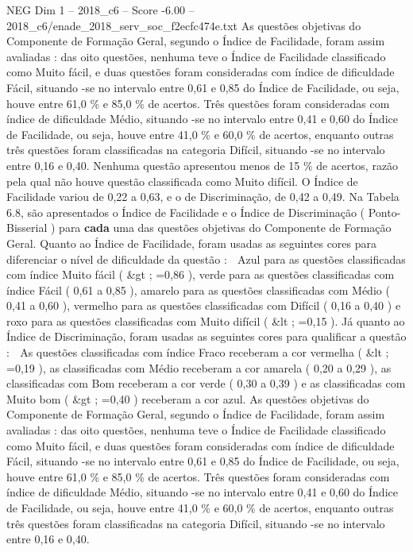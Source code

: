 \begin{textsample}{NEG Dim 1 – 2018\_c6 – Score -6.00 – 2018\_c6/enade\_2018\_serv\_soc\_f2ecfc474e.txt}
As questões objetivas do Componente de Formação Geral, segundo o Índice de Facilidade, foram assim avaliadas : das oito questões, nenhuma teve o Índice de Facilidade classificado como Muito fácil, e duas questões foram consideradas com índice de dificuldade Fácil, situando -se no intervalo entre 0,61 e 0,85 do Índice de Facilidade, ou seja, houve entre 61,0 \% e 85,0 \% de acertos.
Três questões foram consideradas com índice de dificuldade Médio, situando -se no intervalo entre 0,41 e 0,60 do Índice de Facilidade, ou seja, houve entre 41,0 \% e 60,0 \% de acertos, enquanto outras três questões foram classificadas na categoria Difícil, situando -se no intervalo entre 0,16 e 0,40.
Nenhuma questão apresentou menos de 15 \% de acertos, razão pela qual não houve questão classificada como Muito difícil.
O Índice de Facilidade variou de 0,22 a 0,63, e o de Discriminação, de 0,42 a 0,49.
Na Tabela 6.8, são apresentados o Índice de Facilidade e o Índice de Discriminação ( Ponto-Bisserial ) para \textbf{cada} uma das questões objetivas do Componente de Formação Geral.
Quanto ao Índice de Facilidade, foram usadas as seguintes cores para diferenciar o nível de dificuldade da questão :  Azul para as questões classificadas com índice Muito fácil ( \&gt ; =0,86 ), verde para as questões classificadas com índice Fácil ( 0,61 a 0,85 ), amarelo para as questões classificadas com Médio ( 0,41 a 0,60 ), vermelho para as questões classificadas com Difícil ( 0,16 a 0,40 ) e roxo para as questões classificadas com Muito difícil ( \&lt ; =0,15 ).
Já quanto ao Índice de Discriminação, foram usadas as seguintes cores para qualificar a questão :  As questões classificadas com índice Fraco receberam a cor vermelha ( \&lt ; =0,19 ), as classificadas com Médio receberam a cor amarela ( 0,20 a 0,29 ), as classificadas com Bom receberam a cor verde ( 0,30 a 0,39 ) e as classificadas com Muito bom ( \&gt ; =0,40 ) receberam a cor azul.
As questões objetivas do Componente de Formação Geral, segundo o Índice de Facilidade, foram assim avaliadas : das oito questões, nenhuma teve o Índice de Facilidade classificado como Muito fácil, e duas questões foram consideradas com índice de dificuldade Fácil, situando -se no intervalo entre 0,61 e 0,85 do Índice de Facilidade, ou seja, houve entre 61,0 \% e 85,0 \% de acertos.
Três questões foram consideradas com índice de dificuldade Médio, situando -se no intervalo entre 0,41 e 0,60 do Índice de Facilidade, ou seja, houve entre 41,0 \% e 60,0 \% de acertos, enquanto outras três questões foram classificadas na categoria Difícil, situando -se no intervalo entre 0,16 e 0,40.

\end{textsample}
